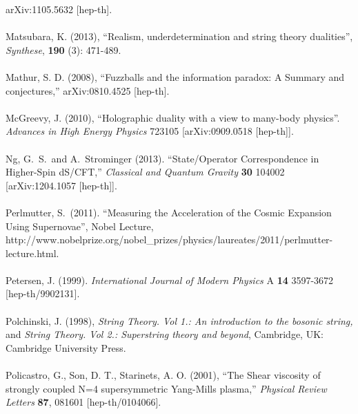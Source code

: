 \documentclass[12pt]{article}
\renewcommand{\^}[1]{\hat{#1}}
\begin{document}
  arXiv:1105.5632 [hep-th]. \\
  \\
  Matsubara, K. (2013), ``Realism, underdetermination and string theory dualities'', {\it Synthese}, {\bf 190} (3): 471-489.\\
\\
Mathur, S. D. (2008), ``Fuzzballs and the information paradox: A Summary and conjectures,''
  arXiv:0810.4525 [hep-th].\\
\\
McGreevy, J. (2010), ``Holographic duality with a view to many-body physics''. {\em Advances in High Energy Physics} 723105 [arXiv:0909.0518 [hep-th]].\\
\\
Ng, G.~S.~and A.~Strominger (2013). ``State/Operator Correspondence in Higher-Spin dS/CFT,''
{\it  Classical and Quantum Gravity}  {\bf 30}  104002
  [arXiv:1204.1057 [hep-th]].\\
\\
Perlmutter, S.~(2011). ``Measuring the Acceleration of the Cosmic Expansion Using Supernovae'', Nobel Lecture, http://www.nobelprize.org/nobel\_prizes/physics/laureates/2011/perlmutter-lecture.html.\\
\\
Petersen, J. (1999). {\it International Journal of Modern Physics} A {\bf 14} 3597-3672 
  [hep-th/9902131].\\
\\
Polchinski, J. (1998), {\it String Theory. Vol 1.: An introduction to the bosonic string,} and {\it String Theory. Vol 2.: Superstring theory and beyond}, Cambridge, UK: Cambridge University Press.\\
\\
Policastro, G., Son, D. T., Starinets, A. O. (2001), ``The Shear viscosity of strongly coupled N=4 supersymmetric Yang-Mills plasma,''
  {\it Physical Review Letters}  {\bf 87}, 081601 
  [hep-th/0104066].\\
\\
\end{document}
